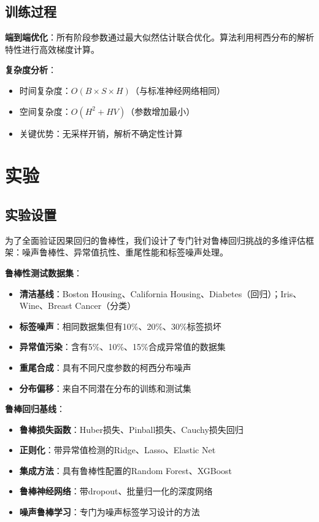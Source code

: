 \documentclass[conference]{IEEEtran}
\begin{document}
\begin{CJK}{UTF8}{gbsn}
\subsection{训练过程}

\textbf{端到端优化}：所有阶段参数通过最大似然估计联合优化。算法利用柯西分布的解析特性进行高效梯度计算。

\textbf{复杂度分析}：
\begin{itemize}
\item 时间复杂度：$O(B \times S \times H)$（与标准神经网络相同）
\item 空间复杂度：$O(H^2 + HV)$（参数增加最小）
\item 关键优势：无采样开销，解析不确定性计算
\end{itemize}

\section{实验}
\label{sec:experiments}

\subsection{实验设置}

为了全面验证因果回归的鲁棒性，我们设计了专门针对鲁棒回归挑战的多维评估框架：噪声鲁棒性、异常值抗性、重尾性能和标签噪声处理。

\textbf{鲁棒性测试数据集}：
\begin{itemize}
\item \textbf{清洁基线}：Boston Housing、California Housing、Diabetes（回归）；Iris、Wine、Breast Cancer（分类）
\item \textbf{标签噪声}：相同数据集但有10\%、20\%、30\%标签损坏
\item \textbf{异常值污染}：含有5\%、10\%、15\%合成异常值的数据集
\item \textbf{重尾合成}：具有不同尺度参数的柯西分布噪声
\item \textbf{分布偏移}：来自不同潜在分布的训练和测试集
\end{itemize}

\textbf{鲁棒回归基线}：
\begin{itemize}
\item \textbf{鲁棒损失函数}：Huber损失、Pinball损失、Cauchy损失回归
\item \textbf{正则化}：带异常值检测的Ridge、Lasso、Elastic Net
\item \textbf{集成方法}：具有鲁棒性配置的Random Forest、XGBoost
\item \textbf{鲁棒神经网络}：带dropout、批量归一化的深度网络
\item \textbf{噪声鲁棒学习}：专门为噪声标签学习设计的方法
\end{itemize}


\end{CJK}
\end{document}

